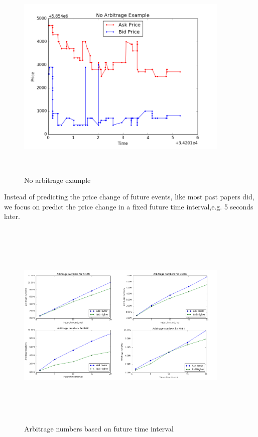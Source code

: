 \begin{figure}[hbtp]
  \begin{center}
    \includegraphics[width=4in,height=4in]{figures/no_arbi_example.png}
  \end{center}
\caption{No arbitrage example} \label{fig:no_arbi}
\end{figure}

Instead of predicting the price change of future events, like most past papers did, we focus on predict the price change in a fixed future time interval,e.g. 5 seconds later.

\begin{figure}[hbtp]
  \begin{center}
    \includegraphics[width=4in,height=4in]{figures/arbitrage_time.png}
  \end{center}
\caption{Arbitrage numbers based on future time interval} \label{fig:arbitrage_time}
\end{figure}

